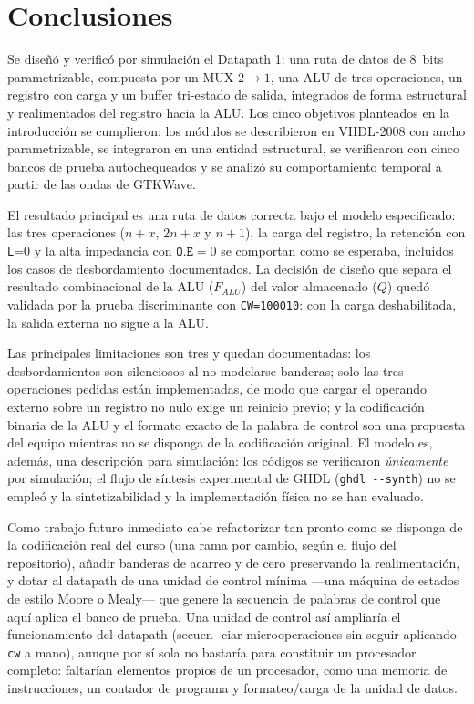 \documentclass[llncs]{llncs}
\begin{document}
\section{Conclusiones}
\label{sec:conclusiones}

Se diseñó y verificó por simulación el Datapath 1: una ruta de datos de
8~bits parametrizable, compuesta por un MUX $2\to1$, una ALU de tres
operaciones, un registro con carga y un buffer tri-estado de salida,
integrados de forma estructural y realimentados del registro hacia la ALU.
Los cinco objetivos planteados en la introducción se cumplieron: los
módulos se describieron en VHDL-2008 con ancho parametrizable, se
integraron en una entidad estructural, se verificaron con cinco bancos de
prueba autochequeados y se analizó su comportamiento temporal a partir de
las ondas de GTKWave.

El resultado principal es una ruta de datos correcta bajo el modelo
especificado: las tres operaciones ($n+x$, $2n+x$ y $n+1$), la carga del
registro, la retención con \texttt{L}=0 y la alta impedancia con
$\mathtt{O.E}=0$ se comportan como se esperaba, incluidos los casos de
desbordamiento documentados. La decisión de diseño que separa el resultado
combinacional de la ALU ($F_{ALU}$) del valor almacenado ($Q$) quedó
validada por la prueba discriminante con \texttt{CW=100010}: con la carga
deshabilitada, la salida externa no sigue a la ALU.

Las principales limitaciones son tres y quedan documentadas: los
desbordamientos son silenciosos al no modelarse banderas; solo las tres
operaciones pedidas están implementadas, de modo que cargar el operando
externo sobre un registro no nulo exige un reinicio previo; y la
codificación binaria de la ALU y el formato exacto de la palabra de control
son una propuesta del equipo mientras no se disponga de la codificación
original. El modelo es, además, una descripción para simulación: los
códigos se verificaron \emph{únicamente} por simulación; el flujo de
síntesis experimental de GHDL (\texttt{ghdl {-}{-}synth}) no se empleó y
la sintetizabilidad y la implementación física no se han evaluado.

Como trabajo futuro inmediato cabe refactorizar tan pronto como se
disponga de la codificación real del curso (una rama por cambio, según el
flujo del repositorio), añadir banderas de acarreo y de cero preservando
la realimentación, y dotar al datapath de una unidad de control mínima
---una máquina de estados de estilo Moore o Mealy--- que genere la
secuencia de palabras de control que aquí aplica el banco de prueba. Una
unidad de control así ampliaría el funcionamiento del datapath (secuen-
ciar microoperaciones sin seguir aplicando \texttt{cw} a mano), aunque por
sí sola no bastaría para constituir un procesador completo: faltarían
elementos propios de un procesador, como una memoria de instrucciones,
un contador de programa y formateo/carga de la unidad de datos.
\end{document}
